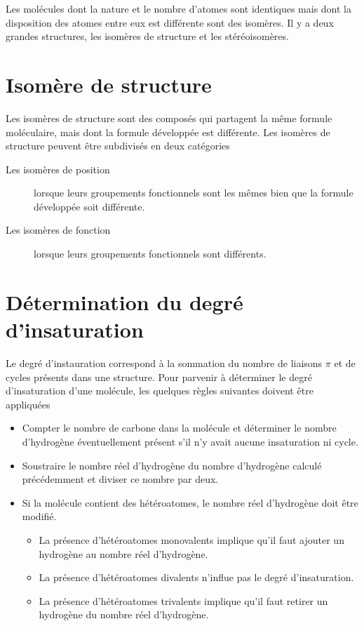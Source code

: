 Les molécules dont la nature et le nombre d'atomes sont identiques mais dont la disposition des atomes entre eux est différente sont des isomères.
Il y a deux grandes structures, les isomères de structure et les stéréoisomères.

\section{Isomère de structure}
Les isomères de structure sont des composés qui partagent la même formule moléculaire, mais dont la formule développée est différente.
Les isomères de structure peuvent être subdivisés en deux catégories
\begin{description}
  \item[Les isomères de position] lorsque leurs groupements fonctionnels sont les mêmes bien que la formule développée soit différente.
  \item[Les isomères de fonction] lorsque leurs groupements fonctionnels sont différents.
\end{description}

\section{Détermination du degré d'insaturation}
Le degré d'instauration  correspond à la sommation du nombre de liaisons $\pi$ et de cycles présents dans une structure.
Pour parvenir à déterminer le degré d'insaturation d'une molécule, les quelques règles suivantes doivent être appliquées
\begin{itemize}
  \item Compter le nombre de carbone dans la molécule et déterminer le nombre d'hydrogène éventuellement présent s'il n'y avait aucune insaturation ni cycle.
  \item Soustraire le nombre réel d'hydrogène du nombre d'hydrogène calculé précédemment et  diviser ce nombre par deux.
  \item Si la molécule contient des hétéroatomes, le nombre réel d'hydrogène doit être modifié.
    \begin{itemize}
      \item La présence d'hétéroatomes monovalents implique qu'il faut ajouter un hydrogène au nombre réel d'hydrogène.
      \item La présence d'hétéroatomes divalents n'influe pas le degré d'insaturation.
      \item La présence d'hétéroatomes trivalents implique qu'il faut retirer un hydrogène du nombre réel d'hydrogène.
    \end{itemize}
\end{itemize}

